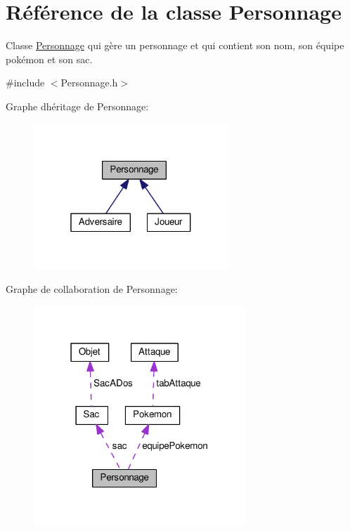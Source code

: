 \hypertarget{class_personnage}{}\section{Référence de la classe Personnage}
\label{class_personnage}


Classe \hyperlink{class_personnage}{Personnage} qui gère un personnage et qui contient son nom, son équipe pokémon et son sac.  




{\ttfamily \#include $<$Personnage.\+h$>$}



Graphe d\textquotesingle{}héritage de Personnage\+:\nopagebreak
\begin{figure}[H]
\begin{center}
\leavevmode
\includegraphics[width=208pt]{class_personnage__inherit__graph}
\end{center}
\end{figure}


Graphe de collaboration de Personnage\+:\nopagebreak
\begin{figure}[H]
\begin{center}
\leavevmode
\includegraphics[width=226pt]{class_personnage__coll__graph}
\end{center}
\end{figure}
